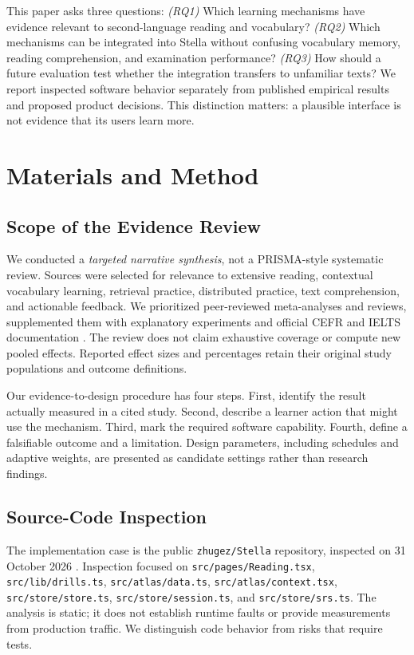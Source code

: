\documentclass[conference,10pt]{IEEEtran}
\begin{document}
This paper asks three questions: \emph{(RQ1)} Which learning mechanisms have evidence relevant to second-language reading and vocabulary? \emph{(RQ2)} Which mechanisms can be integrated into Stella without confusing vocabulary memory, reading comprehension, and examination performance? \emph{(RQ3)} How should a future evaluation test whether the integration transfers to unfamiliar texts? We report inspected software behavior separately from published empirical results and proposed product decisions. This distinction matters: a plausible interface is not evidence that its users learn more.

\section{Materials and Method}
\subsection{Scope of the Evidence Review}
We conducted a \emph{targeted narrative synthesis}, not a PRISMA-style systematic review. Sources were selected for relevance to extensive reading, contextual vocabulary learning, retrieval practice, distributed practice, text comprehension, and actionable feedback. We prioritized peer-reviewed meta-analyses and reviews, supplemented them with explanatory experiments and official CEFR and IELTS documentation \cite{sangers2025,yanagisawa2020,roediger2006,coe2020,ieltsformat}. The review does not claim exhaustive coverage or compute new pooled effects. Reported effect sizes and percentages retain their original study populations and outcome definitions.

Our evidence-to-design procedure has four steps. First, identify the result actually measured in a cited study. Second, describe a learner action that might use the mechanism. Third, mark the required software capability. Fourth, define a falsifiable outcome and a limitation. Design parameters, including schedules and adaptive weights, are presented as candidate settings rather than research findings.

\subsection{Source-Code Inspection}
The implementation case is the public \texttt{zhugez/Stella} repository, inspected on 31 October 2026 \cite{stellarepo}. Inspection focused on \texttt{src/pages/Reading.tsx}, \texttt{src/lib/drills.ts}, \texttt{src/atlas/data.ts}, \texttt{src/atlas/context.tsx}, \texttt{src/store/store.ts}, \texttt{src/store/session.ts}, and \texttt{src/store/srs.ts}. The analysis is static; it does not establish runtime faults or provide measurements from production traffic. We distinguish code behavior from risks that require tests.
\end{document}

